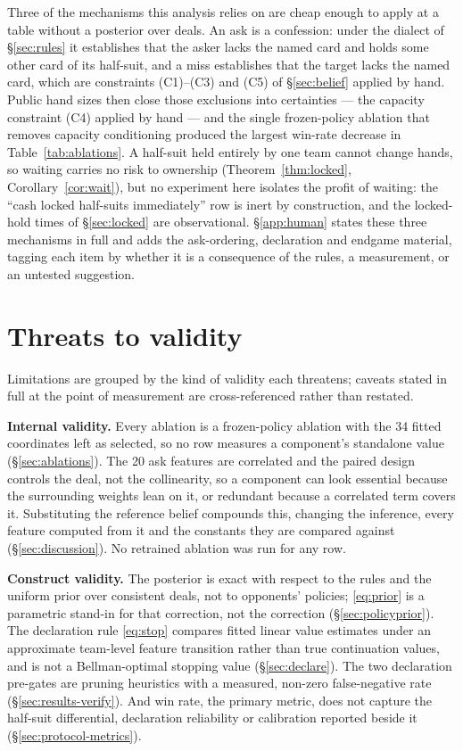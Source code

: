 \documentclass[11pt]{article}
\theoremstyle{definition}
\newcommand{\numParams}{34}
\newcommand{\numAskFeats}{20}
\begin{document}
Three of the mechanisms this analysis relies on are cheap enough to apply at a
table without a posterior over deals. An ask is a confession: under the dialect
of \S\ref{sec:rules} it establishes that the asker lacks the named card and holds
some other card of its half-suit, and a miss establishes that the target lacks
the named card, which are constraints (C1)--(C3) and (C5) of \S\ref{sec:belief}
applied by hand. Public hand sizes then close those exclusions into certainties
--- the capacity constraint (C4) applied by hand --- and the single frozen-policy
ablation that removes capacity conditioning produced the largest win-rate
decrease in Table~\ref{tab:ablations}. A half-suit held entirely by one team
cannot change hands, so waiting carries no risk to ownership
(Theorem~\ref{thm:locked}, Corollary~\ref{cor:wait}), but no experiment here
isolates the profit of waiting: the ``cash locked half-suits immediately'' row is
inert by construction, and the locked-hold times of \S\ref{sec:locked} are
observational. \S\ref{app:human} states these three mechanisms in full and adds
the ask-ordering, declaration and endgame material, tagging each item by whether
it is a consequence of the rules, a measurement, or an untested suggestion.
\section{Threats to validity}
\label{sec:limitations}

Limitations are grouped by the kind of validity each threatens; caveats stated
in full at the point of measurement are cross-referenced rather than restated.

\textbf{Internal validity.} Every ablation is a frozen-policy ablation with the
\numParams{} fitted coordinates left as selected, so no row measures a
component's standalone value (\S\ref{sec:ablations}). The \numAskFeats{} ask
features are correlated and the paired design controls the deal, not the
collinearity, so a component can look essential because the surrounding weights
lean on it, or redundant because a correlated term covers it.
Substituting the reference belief compounds this, changing the inference, every
feature computed from it and the constants they are compared against
(\S\ref{sec:discussion}). No retrained ablation was run for any row.

\textbf{Construct validity.} The posterior is exact with respect to the rules
and the uniform prior over consistent deals, not to opponents' policies;
\eqref{eq:prior} is a parametric stand-in for that correction, not the correction
(\S\ref{sec:policyprior}). The declaration rule \eqref{eq:stop} compares fitted
linear value estimates under an approximate team-level feature transition rather
than true continuation values, and is not a Bellman-optimal stopping value
(\S\ref{sec:declare}). The two declaration
pre-gates are pruning heuristics with a measured, non-zero false-negative rate
(\S\ref{sec:results-verify}). And win rate, the primary metric, does not capture
the half-suit differential, declaration reliability or calibration reported
beside it (\S\ref{sec:protocol-metrics}).
\end{document}
